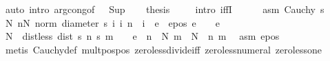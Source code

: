 \begin{isabellebody}
\ {\isacharparenleft}{\kern0pt}auto\ intro{\isacharbang}{\kern0pt}{\isacharcolon}{\kern0pt}\ arg{\isacharunderscore}{\kern0pt}cong{\isacharbrackleft}{\kern0pt}of\ {\isacharunderscore}{\kern0pt}\ {\isacharunderscore}{\kern0pt}\ Sup{\isacharbrackright}{\kern0pt}{\isacharparenright}{\kern0pt}\isanewline
\ \ \isamarkupfalse%
\ {\isacharquery}{\kern0pt}thesis\ \isanewline
\ \ \isamarkupfalse%
\ {\isacharparenleft}{\kern0pt}intro\ iffI{\isacharparenright}{\kern0pt}\isanewline
\ \ \ \ \isamarkupfalse%
\ asm{\isacharcolon}{\kern0pt}\ {\isachardoublequoteopen}Cauchy\ s{\isachardoublequoteclose}\isanewline
\ \ \ \ \isamarkupfalse%
\ {\isachardoublequoteopen}{\isasymexists}N{\isachardot}{\kern0pt}\ {\isasymforall}n{\isasymge}N{\isachardot}{\kern0pt}\ norm\ {\isacharparenleft}{\kern0pt}diameter\ {\isacharbraceleft}{\kern0pt}s\ i\ {\isacharbar}{\kern0pt}i{\isachardot}{\kern0pt}\ n\ {\isasymle}\ i{\isacharbraceright}{\kern0pt}{\isacharparenright}{\kern0pt}\ {\isacharless}{\kern0pt}\ e{\isachardoublequoteclose}\ \ e{\isacharunderscore}{\kern0pt}pos{\isacharcolon}{\kern0pt}\ {\isachardoublequoteopen}e\ {\isachargreater}{\kern0pt}\ {}{\isachardoublequoteclose}\ \ e\isanewline
\ \ \ \ \isamarkupfalse%
\ {\isacharminus}{\kern0pt}\isanewline
\ \ \ \ \ \ \isamarkupfalse%
\ N\ \ dist{\isacharunderscore}{\kern0pt}less{\isacharcolon}{\kern0pt}\ {\isachardoublequoteopen}dist\ {\isacharparenleft}{\kern0pt}s\ n{\isacharparenright}{\kern0pt}\ {\isacharparenleft}{\kern0pt}s\ m{\isacharparenright}{\kern0pt}\ {\isacharless}{\kern0pt}\ {\isacharparenleft}{\kern0pt}{}{\isacharslash}{\kern0pt}{}{\isacharparenright}{\kern0pt}\ {\isacharasterisk}{\kern0pt}\ e{\isachardoublequoteclose}\ \ {\isachardoublequoteopen}n\ {\isasymge}\ N{\isachardoublequoteclose}\ {\isachardoublequoteopen}m\ {\isasymge}\ N{\isachardoublequoteclose}\ \ n\ m\ \isamarkupfalse%
\ asm\ e{\isacharunderscore}{\kern0pt}pos\ \isamarkupfalse%
\ {\isacharparenleft}{\kern0pt}metis\ Cauchy{\isacharunderscore}{\kern0pt}def\ mult{\isacharunderscore}{\kern0pt}pos{\isacharunderscore}{\kern0pt}pos\ zero{\isacharunderscore}{\kern0pt}less{\isacharunderscore}{\kern0pt}divide{\isacharunderscore}{\kern0pt}iff\ zero{\isacharunderscore}{\kern0pt}less{\isacharunderscore}{\kern0pt}numeral\ zero{\isacharunderscore}{\kern0pt}less{\isacharunderscore}{\kern0pt}one{\isacharparenright}{\kern0pt}\isanewline

\end{isabellebody}
